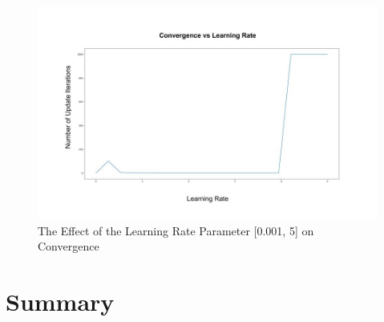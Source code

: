 \documentclass[12pt]{article}
\begin{document}
\begin{figure}[!htb] %
  \centering
  \includegraphics[width = \linewidth]{Conv.jpg}
  \caption{The Effect of the Learning Rate Parameter [0.001, 5] on Convergence}
\end{figure}
\FloatBarrier

\section{Summary}
\end{document}
